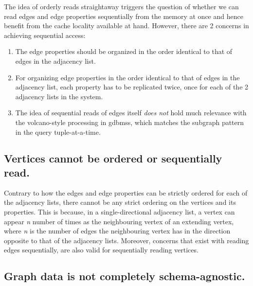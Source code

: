 The idea of orderly reads straightaway triggers the question of whether we can read edges and edge properties sequentially from the memory at once and hence benefit from the cache locality available at hand. However, there are 2 concerns in achieving sequential access: 

\begin{enumerate}
	
	\item The edge properties should be organized in the order identical to that of edges in the adjacency list.
	
	\item For organizing edge properties in the order identical to that of edges in the adjacency list, each property has to be replicated twice, once for each of the 2 adjacency lists in the system.
	
	\item The idea of sequential reads of edges itself \emph{does not} hold much relevance with the volcano-style processing in \gls{gdbms}s, which matches the subgraph pattern in the query tuple-at-a-time.
	
\end{enumerate}

\subsection{Vertices cannot be ordered or sequentially read.}
\label{ssec:vertices-unordered}

Contrary to how the edges and edge properties can be strictly ordered for each of the adjacency lists, there cannot be any strict ordering on the vertices and its properties. This is because, in a single-directional adjacency list, a vertex can appear \textit{n} number of times as the neighbouring vertex of an extending vertex, where \textit{n} is the number of edges the neighbouring vertex has in the direction opposite to that of the adjacency lists. Moreover, concerns that exist with reading edges sequentially, are also valid for sequentially reading vertices.

\subsection{Graph data is not completely schema-agnostic.}
\label{ssec:graph-schema}

